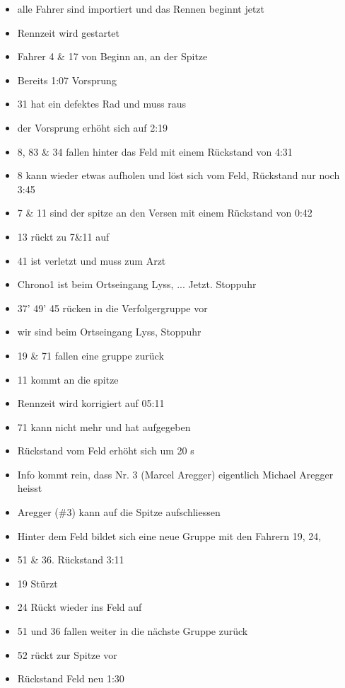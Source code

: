\begin{itemize}
\item alle Fahrer sind importiert und das Rennen beginnt jetzt
\item Rennzeit wird gestartet
\item Fahrer 4 \& 17 von Beginn an, an der Spitze
\item Bereits 1:07 Vorsprung
\item 31 hat ein defektes Rad und muss raus
\item der Vorsprung erhöht sich auf 2:19
\item 8, 83 \& 34 fallen hinter das Feld mit einem Rückstand von 4:31
\item 8 kann wieder etwas aufholen und löst sich vom Feld, Rückstand nur noch 3:45
\item 7 \& 11 sind der spitze an den Versen mit einem Rückstand von 0:42
\item 13 rückt zu 7\&11 auf
\item 41 ist verletzt und muss zum Arzt
\item Chrono1 ist beim Ortseingang Lyss, ... Jetzt. Stoppuhr
\item 37' 49' 45 rücken in die Verfolgergruppe vor
\item wir sind beim Ortseingang Lyss, Stoppuhr
\item 19 \& 71 fallen eine gruppe zurück
\item 11 kommt an die spitze
\item Rennzeit wird korrigiert auf 05:11
\item 71 kann nicht mehr und hat aufgegeben
\item Rückstand vom Feld erhöht sich um 20 s
\item Info kommt rein, dass Nr. 3 (Marcel Aregger) eigentlich Michael Aregger heisst
\item Aregger (\#3) kann auf die Spitze aufschliessen
\item Hinter dem Feld bildet sich eine neue Gruppe mit den Fahrern 19, 24, \item 51 \& 36. Rückstand 3:11
\item 19 Stürzt
\item 24 Rückt wieder ins Feld auf
\item 51 und 36 fallen weiter in die nächste Gruppe zurück
\item 52 rückt zur Spitze vor
\item Rückstand Feld neu 1:30
\end{itemize}

